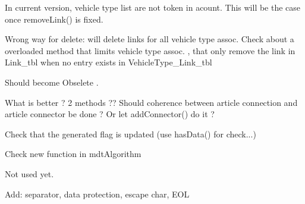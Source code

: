 \begin{DoxyRefList}
\item[\label{todo__todo000049}%
\hypertarget{todo__todo000049}{}%
Member \hyperlink{classmdt_cl_link_ac32bfef9f23b431ea4d3d546e6c21361}{mdt\-Cl\-Link\-:\-:disconnect\-Connectors} (const Q\-Variant \&start\-Unit\-Connector\-Id, const Q\-Variant \&end\-Unit\-Connector\-Id, const Q\-List$<$ Q\-Variant $>$ \&start\-Vehicle\-Type\-Id\-List, const Q\-List$<$ Q\-Variant $>$ \&end\-Vehicle\-Type\-Id\-List)]In current version, vehicle type list are not token in acount. This will be the case once remove\-Link() is fixed.  
\item[\label{todo__todo000048}%
\hypertarget{todo__todo000048}{}%
Member \hyperlink{classmdt_cl_link_a865c0cee1fab1c9209d139dcd70f9fbd}{mdt\-Cl\-Link\-:\-:remove\-Link} (const Q\-Variant \&unit\-Connection\-Start\-Id, const Q\-Variant \&unit\-Connection\-End\-Id, bool handle\-Transaction=true)]Wrong way for delete\-: will delete links for all vehicle type assoc. Check about a overloaded method that limits vehicle type assoc. , that only remove the link in Link\-\_\-tbl when no entry exists in Vehicle\-Type\-\_\-\-Link\-\_\-tbl  
\item[\label{todo__todo000050}%
\hypertarget{todo__todo000050}{}%
Member \hyperlink{classmdt_cl_path_graph_a63ddfb9e8d64041ad17c992eac172a8a}{mdt\-Cl\-Path\-Graph\-:\-:last\-Error\-Message} () const ]Should become Obselete .  
\item[\label{todo__todo000051}%
\hypertarget{todo__todo000051}{}%
Member \hyperlink{classmdt_cl_unit_a9aa3d52f4e6d79fa003d96e04be8223e}{mdt\-Cl\-Unit\-:\-:add\-Connection\-Data\-List\-From\-Article\-Connection\-Id\-List} (\hyperlink{classmdt_cl_unit_connector_data}{mdt\-Cl\-Unit\-Connector\-Data} \&data, const Q\-List$<$ Q\-Variant $>$ \&article\-Connection\-Id\-List, bool copy\-Contact\-Name)]What is better ? 2 methods ?? Should coherence between article connection and article connector be done ? Or let add\-Connector() do it ? 
\item[\label{todo__todo000052}%
\hypertarget{todo__todo000052}{}%
Member \hyperlink{classmdt_cl_unit_connection_data_a6922e05be582dd95de82bfe4dd8434f9}{mdt\-Cl\-Unit\-Connection\-Data\-:\-:mdt\-Cl\-Unit\-Connection\-Data} (const Q\-Sql\-Record \&record)]Check that the generated flag is updated (use has\-Data() for check...)  
\item[\label{todo__todo000075}%
\hypertarget{todo__todo000075}{}%
Member \hyperlink{classmdt_csv_file_afe815d4fbdc08c442c9b1dce447cda75}{mdt\-Csv\-File\-:\-:clear} ()]Check new function in mdt\-Algorithm  
\item[\label{todo__todo000002}%
\hypertarget{todo__todo000002}{}%
Member \hyperlink{classmdt_data_table_manager_a8fa0924a76e8f3fec9617f690cc4e148}{mdt\-Data\-Table\-Manager\-:\-:data\-Set\-Directory} () const ]Not used yet.  
\item[\label{todo__todo000003}%
\hypertarget{todo__todo000003}{}%
Member \hyperlink{classmdt_data_table_manager_abe733f071ca77579522823598e79dd9a}{mdt\-Data\-Table\-Manager\-:\-:export\-To\-Csv\-File} (const Q\-String \&file\-Path, \hyperlink{classmdt_sql_database_manager_a2f5b46d67a88095053a5edfc415c7418}{mdt\-Sql\-Database\-Manager\-::create\-Mode\-\_\-t} mode)]Add\-: separator, data protection, escape char, E\-O\-L 


\end{DoxyRefList}
